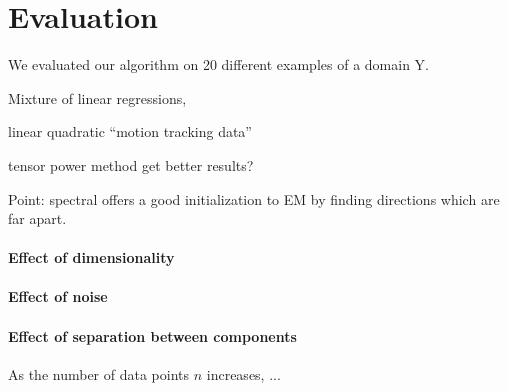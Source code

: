 \section{Evaluation}
\label{sec:evaluation}

We evaluated our algorithm on 20 different examples of a domain Y.

Mixture of linear regressions, 

linear 
quadratic
``motion tracking data''

tensor power method get better results?

Point: spectral offers a good initialization to EM by finding directions which
are far apart.

\paragraph{Effect of dimensionality}

\paragraph{Effect of noise}

\paragraph{Effect of separation between components}

As the number of data points $n$ increases, ...

